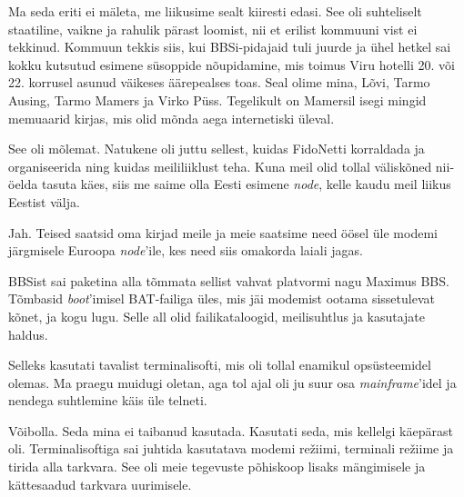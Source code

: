 Ma seda eriti ei mäleta, me liikusime sealt kiiresti 
edasi. See oli suhteliselt staatiline, vaikne ja rahulik pärast 
loomist, nii et erilist kommuuni vist ei tekkinud. Kommuun tekkis siis, kui BBSi-pidajaid tuli juurde ja ühel
hetkel sai kokku kutsutud esimene süsoppide nõupidamine, mis toimus Viru 
hotelli 20. või 22. korrusel asunud väikeses äärepealses toas. Seal olime mina, 
Lõvi, Tarmo Ausing, Tarmo 
Mamers ja Virko Püss. 
Tegelikult on Mamersil isegi mingid memuaarid kirjas, mis olid mõnda aega 
internetiski üleval. 


See oli mõlemat. Natukene oli juttu sellest, kuidas FidoNetti 
korraldada ja organiseerida ning kuidas meililiiklust teha. Kuna meil olid 
tollal väliskõned nii-öelda tasuta käes, siis me saime olla Eesti 
esimene \emph{node}, kelle kaudu meil liikus Eestist välja. 


Jah. Teised saatsid oma kirjad meile ja meie saatsime need öösel üle 
modemi järgmisele Euroopa \emph{node}'ile, kes need siis omakorda laiali jagas.


BBSist sai paketina
alla tõmmata sellist vahvat platvormi nagu Maximus BBS. 
Tõmbasid \emph{boot}'imisel BAT-failiga üles, mis jäi modemist ootama sissetulevat kõnet, ja kogu lugu. Selle all olid failikataloogid, 
meilisuhtlus ja kasutajate haldus.


Selleks kasutati tavalist terminalisofti, mis oli tollal enamikul 
opsüsteemidel olemas. Ma praegu muidugi oletan, aga tol ajal oli ju suur 
osa \emph{mainframe}'idel ja nendega suhtlemine käis üle telneti.


Võibolla. Seda mina ei taibanud kasutada. Kasutati seda, mis kellelgi käepärast oli. Terminalisoftiga
sai juhtida kasutatava modemi režiimi, terminali režiime ja tirida 
alla tarkvara. See oli meie tegevuste põhiskoop lisaks mängimisele 
ja kättesaadud tarkvara uurimisele.



